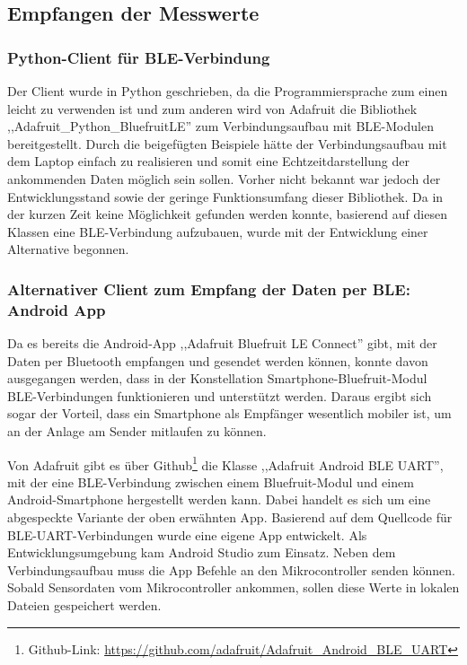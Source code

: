 \subsection{Empfangen der Messwerte}
 
\subsubsection{Python-Client für BLE-Verbindung}
\label{BLE_Python_Client}
Der Client wurde in Python geschrieben, da die Programmiersprache zum einen leicht zu verwenden ist und zum anderen wird von Adafruit die Bibliothek ,,Adafruit\_Python\_BluefruitLE'' zum Verbindungsaufbau mit BLE-Modulen bereitgestellt. Durch die beigefügten Beispiele hätte der Verbindungsaufbau mit dem Laptop einfach zu realisieren und somit eine Echtzeitdarstellung der ankommenden Daten möglich sein sollen. Vorher nicht bekannt war jedoch der Entwicklungsstand sowie der geringe Funktionsumfang dieser Bibliothek. Da in der kurzen Zeit keine Möglichkeit gefunden werden konnte, basierend auf diesen Klassen eine BLE-Verbindung aufzubauen, wurde mit der Entwicklung einer Alternative begonnen.

\subsubsection{Alternativer Client zum Empfang der Daten per BLE: Android App}
\label{AndroidAppFürDatenmessen}
Da es bereits die Android-App ,,Adafruit Bluefruit LE Connect'' gibt, mit der Daten per Bluetooth empfangen und gesendet werden können, konnte davon ausgegangen werden, dass in der Konstellation Smartphone-Bluefruit-Modul BLE-Verbindungen funktionieren und unterstützt werden. Daraus ergibt sich sogar der Vorteil, dass ein Smartphone als Empfänger wesentlich mobiler ist, um an der Anlage am Sender mitlaufen zu können. 

Von Adafruit gibt es über Github\footnote{Github-Link: \url{https://github.com/adafruit/Adafruit_Android_BLE_UART}} die Klasse ,,Adafruit Android BLE UART'', mit der eine BLE-Verbindung zwischen einem Bluefruit-Modul und einem Android-Smartphone hergestellt werden kann. Dabei handelt es sich um eine abgespeckte Variante der oben erwähnten App. Basierend auf dem Quellcode für BLE-UART-Verbindungen wurde eine eigene App entwickelt. Als Entwicklungsumgebung kam Android Studio zum Einsatz. Neben dem Verbindungsaufbau muss die App Befehle an den Mikrocontroller senden können. Sobald Sensordaten vom Mikrocontroller ankommen, sollen diese Werte in lokalen Dateien gespeichert werden.

